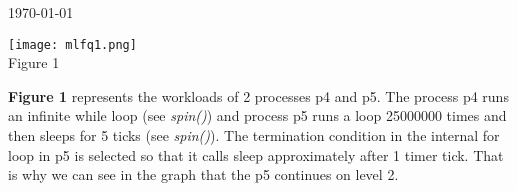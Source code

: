 \documentclass[8pt]{article}
\begin{document}
\hfill \small{\today} \\
\begin{center}{\bf
{}
}\end{center}
\begin{center}{\texttt{[image: mlfq1.png]}} \\
{Figure 1} \\
\end{center}

\textbf{Figure 1} represents the workloads of 2 processes p4 and p5.
The process p4 runs an infinite while loop (see \textit{spin()}) and process p5 runs a loop 25000000 times and then sleeps for 5 ticks (see \textit{spin()}).
The termination condition in the internal for loop in p5 is selected so that it calls sleep approximately after 1 timer tick. That is why we can see
in the graph that the p5 continues on level 2.



\end{document}
